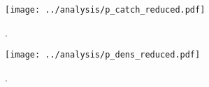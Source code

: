 \documentclass[11pt]{article}
\begin{document}
\renewcommand{\thefigure}{S\arabic{figure}}
\renewcommand{\theequation}{S\arabic{equation}}
\renewcommand{\thetable}{S\arabic{table}}
\setcounter{equation}{0}
\setcounter{figure}{0}
\setcounter{table}{0}

\begin{figure}
\centering
\texttt{[image: ../analysis/p\_catch\_reduced.pdf]}
\caption{\label{fig:p_catch_reduced}
.
}
\end{figure}
\clearpage

\clearpage
\begin{figure}
\centering
\texttt{[image: ../analysis/p\_dens\_reduced.pdf]}
\caption{\label{fig:p_dens_reduced}
.
}
\end{figure}
\clearpage
\end{document}
